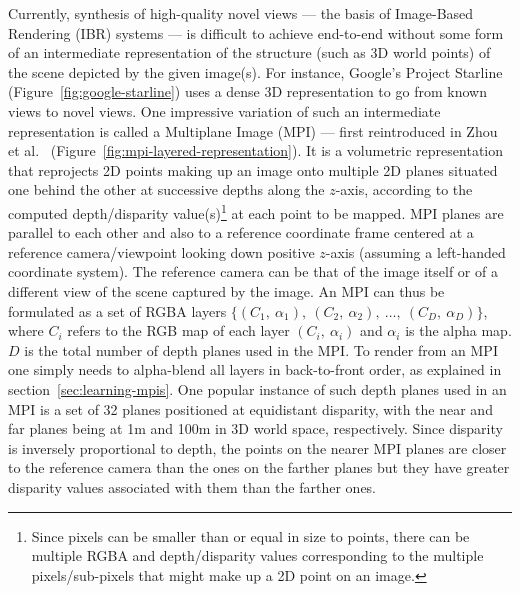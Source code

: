 Currently, synthesis of high-quality novel views --- the basis of Image-Based Rendering (IBR) systems --- is difficult to achieve end-to-end without some form of an intermediate representation of the structure (such as 3D world points) of the scene depicted by the given image(s). For instance, Google's Project Starline (Figure~\ref{fig:google-starline}) uses a dense 3D representation to go from known views to novel views. One impressive variation of such an intermediate representation is called a Multiplane Image (MPI) --- first reintroduced in Zhou et al.~\cite{zhou2018stereo} (Figure~\ref{fig:mpi-layered-representation}). It is a volumetric representation that reprojects 2D points making up an image onto multiple 2D planes situated one behind the other at successive depths along the $z$-axis, according to the computed depth/disparity value(s)\footnote{Since pixels can be smaller than or equal in size to points, there can be multiple RGBA and depth/disparity values corresponding to the multiple pixels/sub-pixels that might make up a 2D point on an image.} at each point to be mapped. MPI planes are parallel to each other and also to a reference coordinate frame centered at a reference camera/viewpoint looking down positive $z$-axis (assuming a left-handed coordinate system). The reference camera can be that of the image itself or of a different view of the scene captured by the image. An MPI can thus be formulated as a set of RGBA layers $\{(C_1,\ \alpha_1),\ (C_2,\ \alpha_2),\ \ldots,\ (C_D,\ \alpha_D)\}$, where $C_i$ refers to the RGB map of each layer $(C_i,\ \alpha_i)$ and $\alpha_i$ is the alpha map. $D$ is the total number of depth planes used in the MPI. To render from an MPI one simply needs to alpha-blend all layers in back-to-front order, as explained in section~\ref{sec:learning-mpis}. One popular instance of such depth planes used in an MPI is a set of 32 planes positioned at equidistant disparity, with the near and far planes being at 1m and 100m in 3D world space, respectively. Since disparity is inversely proportional to depth, the points on the nearer MPI planes are closer to the reference camera than the ones on the farther planes but they have greater disparity values associated with them than the farther ones.


